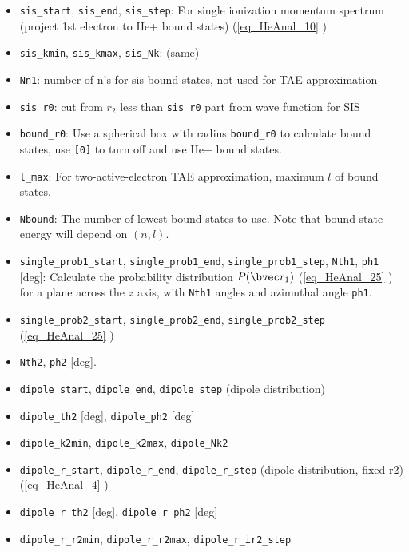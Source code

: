 \begin{itemize}
\item \verb`sis_start`, \verb`sis_end`, \verb`sis_step`: For single ionization momentum spectrum (project 1st electron to He+ bound states) (\autoref{eq_HeAnal_10} )
\item \verb`sis_kmin`, \verb`sis_kmax`, \verb`sis_Nk`: (same)
\item \verb`Nn1`: number of n's for sis bound states, not used for TAE approximation
\item \verb`sis_r0`: cut from $r_2$ less than \verb`sis_r0` part from wave function for SIS
\item \verb`bound_r0`: Use a spherical box with radius \verb`bound_r0` to calculate bound states, use \verb|[0]| to turn off and use He+ bound states.
\item \verb`l_max`: For two-active-electron TAE approximation, maximum $l$ of bound states.
\item \verb`Nbound`: The number of lowest bound states to use. Note that bound state energy will depend on $(n, l)$.

\item \verb`single_prob1_start`, \verb`single_prob1_end`, \verb`single_prob1_step`, \verb`Nth1`, \verb`ph1` [deg]: Calculate the probability distribution $P(\bvec r_1)$ (\autoref{eq_HeAnal_25} ) for a plane across the $z$ axis, with \verb|Nth1| angles and azimuthal angle \verb|ph1|.

\item \verb`single_prob2_start`, \verb`single_prob2_end`, \verb`single_prob2_step` (\autoref{eq_HeAnal_25} )
\item \verb`Nth2`, \verb`ph2` [deg].

\item \verb`dipole_start`, \verb`dipole_end`, \verb`dipole_step` (dipole distribution)
\item \verb`dipole_th2` [deg], \verb`dipole_ph2` [deg]
\item \verb`dipole_k2min`, \verb`dipole_k2max`, \verb`dipole_Nk2`

\item \verb`dipole_r_start`, \verb`dipole_r_end`, \verb`dipole_r_step` (dipole distribution, fixed r2) (\autoref{eq_HeAnal_4} )
\item \verb`dipole_r_th2` [deg], \verb`dipole_r_ph2` [deg]
\item \verb`dipole_r_r2min`, \verb`dipole_r_r2max`, \verb`dipole_r_ir2_step`
\end{itemize}
